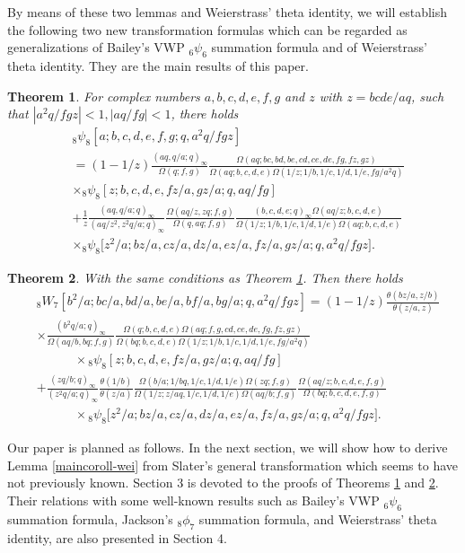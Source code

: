 \documentclass[xits,review,sort&compress]{elsarticle}
\newtheorem{dl}{Theorem}[section]
\numberwithin{equation}{section}
\begin{document}
By means of  these two lemmas and Weierstrass' theta identity, we will establish  the following  two new transformation formulas which can be regarded as  generalizations of  Bailey's VWP ${}_6\psi_6$ summation formula and of Weierstrass' theta identity. They are the main results of this paper.


\begin{dl}\label{maintrans-I} For complex numbers $a,b,c,d,e,f,g$ and $z$ with $z=bcde/aq$, such that $|a^2q/fgz|<1, |aq/fg|<1$, there holds
\begin{align}
 &{}_{8} \psi_{8}\left[a ; b, c, d, e, f, g ; q, a^2q/fgz\right] \nonumber\\
 &=(1-1/z)\frac{(aq, q / a; q)_{\infty}}{\Omega(q;f,g)}\frac{\Omega(aq;bc,bd,be,cd,ce,de,fg, fz,gz)}{\Omega(aq;b,c,d,e)\Omega(1/z;1/b,1/c,1/d,
 1/e,fg/a^{2}q )}\nonumber\\
  &\times {}_{8} \psi_{8}[z ; b, c, d, e, fz/ a, gz / a ; q, aq / fg] \label{finalidentities-former}\\
 &+\frac{1}{z}\frac{(aq, q / a; q)_{\infty}}{\left(aq/z^2,z^2q/a;q\right)_{\infty}} \frac{\Omega(aq/z,zq;f,g)}{\Omega(q,aq;f,g)}
 \frac{(b, c, d, e; q)_{\infty}\Omega(aq/z;b,c,d,e)}{\Omega(1/z;1/b,1/c,1/d,1/e)\Omega(aq; b,  c, d,  e)}\nonumber\\
 &\times {}_{8}\psi_{8}\big[z^2/a;bz/a,cz/a,dz/a,
ez/a,fz/a,gz/a;q,a^2q/fgz\big]. \nonumber
\end{align}
 \end{dl}

\begin{dl}\label{maintrans-II}  With the same conditions as Theorem \ref{maintrans-I}. Then there holds
\begin{align}
 &{}_{8}W_{7}\left[b^{2} / a ; b c / a, b d / a, b e / a, b f / a, b g / a ; q, a^{2}q / fgz\right]=(1-1/z)
\frac{\theta(bz/a,z/b)}{\theta(z/a,z)} \nonumber\\
&\times\frac{(b^2 q/a; q)_{\infty}}{\Omega(aq/b, bq;f,g)}\frac{\Omega(q;b,c,d,e)\Omega(aq;f,g,cd,ce,de,fg, fz,gz)}{\Omega( bq;b,c,d,e)\Omega(1/z;1/b,1/c,1/d,
 1/e,fg/a^{2}q )}\nonumber\\
 &\qquad\quad\times {}_{8} \psi_{8}[z ; b, c, d, e, fz/ a, gz / a ; q, aq / f g]\label{finalidentities}\\
 &+\frac{(zq/b;q)_{\infty}}{(z^2q/a;q)_{\infty}}\frac{\theta(1/b)}{\theta(z/a)}
 \frac{\Omega(b/a;1/bq,1/c,1/d,1/e)
 \Omega(zq;f,g)}{\Omega(1/z;z/aq,1/c,1/d,1/e)\Omega(aq/b;f,g)}
\frac{\Omega(aq/z;b,c,d,e,f,g)}{\Omega(bq;b,c,d,e,f,g)}\nonumber\\
 &\qquad\quad\times {}_{8}\psi_{8}\big[z^2/a;bz/a,cz/a,dz/a,
ez/a,fz/a,gz/a;q,a^2q/fgz\big] \nonumber.
\end{align}
 \end{dl}
Our paper is planned as follows. In the next section, we will  show how to derive Lemma \ref{maincoroll-wei} from Slater's
general  transformation which seems to have not previously known. Section 3 is devoted to the proofs of Theorems \ref{maintrans-I} and \ref{maintrans-II}. Their relations with some well-known results such as Bailey's VWP ${}_6\psi_6$ summation formula, Jackson's  ${}_8\phi_7$ summation formula, and Weierstrass' theta identity, are also presented in  Section 4.
\end{document}
